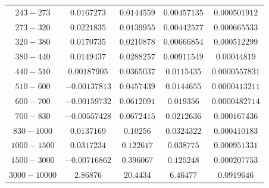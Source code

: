 \documentclass[11pt]{article}
\begin{document}
\begin{table}[htbp]
{\begin{tabular}{ccccc}
		$243-273$ & $0.0167273$ & $0.0144559$       & $0.00457135$      & $0.000501912$ \\
		$273-320$ & $0.0221835$ & $0.0139955$       & $0.00442577$      & $0.000665533$ \\
		$320-380$ & $0.0170735$ & $0.0210878$       & $0.00666854$      & $0.000512299$ \\
		$380-440$ & $0.0149437$ & $0.0288257$       & $0.00911549$      & $0.00044819$ \\
		$440-510$ & $0.00187905$ & $0.0365037$      & $0.0115435$       & $0.0000557831$ \\
		$510-600$ & $-0.00137813$ & $0.0457439$     & $0.0144655$       & $0.0000413211$ \\
		$600-700$ & $-0.00159732$ & $0.0612091$     & $0.019356$        & $0.0000482714$ \\
		$700-830$ & $-0.00557428$ & $0.0672415$     & $0.0212636$       & $0.000167436$ \\
		$830-1000$ & $0.0137169$ & $0.10256$        & $0.0324322$       & $0.000410183$ \\
		$1000-1500$ & $0.0317234$ & $0.122617$      & $0.038775$        & $0.000951331$ \\
		$1500-3000$ & $-0.00716862$ & $0.396067$    & $0.125248$        & $0.000207753$ \\
		$3000-10000$ & $2.86876$ & $20.4434$        & $6.46477$         & $0.0919646$ \\
	\bottomrule
	\end{tabular}
}
\end{table}
\end{document}
